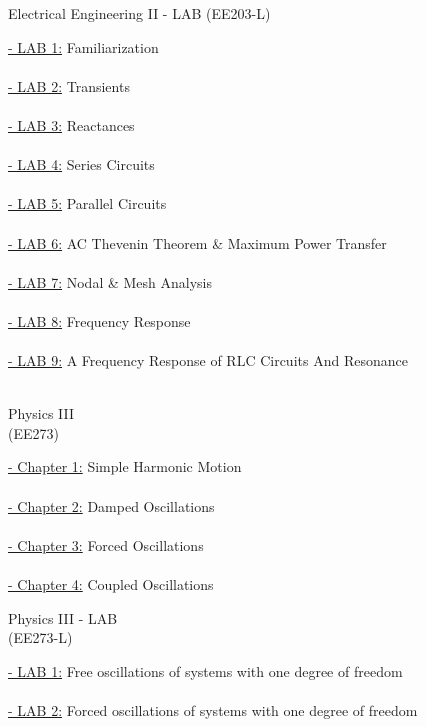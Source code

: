\documentclass[12pt, a4paper]{article}
\begin{document}
\newpage 
\begin{center}
\Huge 
Electrical Engineering II - LAB (EE203-L)
\end{center}
\normalsize
\large \underline{- LAB 1:} Familiarization  \\ \\
\large \underline{- LAB 2:} Transients \\ \\
\large \underline{- LAB 3:} Reactances  \\ \\
\large \underline{- LAB 4:} Series Circuits \\ \\
\large \underline{- LAB 5:} Parallel Circuits  \\ \\
\large \underline{- LAB 6:} AC Thevenin Theorem \& Maximum Power Transfer \\ \\
\large \underline{- LAB 7:} Nodal \& Mesh Analysis  \\ \\
\large \underline{- LAB 8:} Frequency Response \\ \\
\large \underline{- LAB 9:} A Frequency Response of RLC Circuits And Resonance  \\ \\


\newpage 
\begin{center}
\Huge 
Physics III \\ (EE273)
\end{center}
\normalsize
\large \underline{- Chapter 1:} Simple Harmonic Motion\\ \\
\large \underline{- Chapter 2:} Damped Oscillations\\ \\
\large \underline{- Chapter 3:} Forced Oscillations\\ \\
\large \underline{- Chapter 4:} Coupled Oscillations


\newpage 
\begin{center}
\Huge 
Physics III - LAB \\(EE273-L) %
\end{center}
\normalsize
\large \underline{- LAB 1:} Free oscillations of systems with one degree of freedom  \\ \\
\large \underline{- LAB 2:} Forced oscillations of systems with one degree of freedom \\ \\
\end{document}
